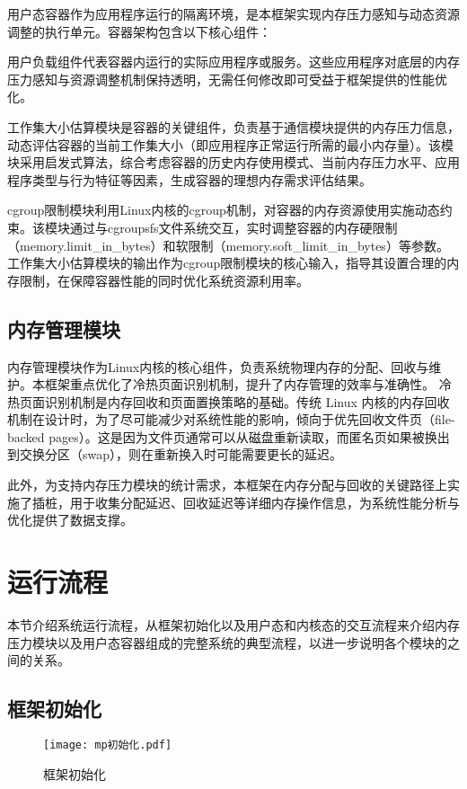 用户态容器作为应用程序运行的隔离环境，是本框架实现内存压力感知与动态资源调整的执行单元。容器架构包含以下核心组件：

用户负载组件代表容器内运行的实际应用程序或服务。这些应用程序对底层的内存压力感知与资源调整机制保持透明，无需任何修改即可受益于框架提供的性能优化。

工作集大小估算模块是容器的关键组件，负责基于通信模块提供的内存压力信息，动态评估容器的当前工作集大小（即应用程序正常运行所需的最小内存量）。该模块采用启发式算法，综合考虑容器的历史内存使用模式、当前内存压力水平、应用程序类型与行为特征等因素，生成容器的理想内存需求评估结果。

cgroup限制模块利用Linux内核的cgroup机制，对容器的内存资源使用实施动态约束。该模块通过与cgroupsfs文件系统交互，实时调整容器的内存硬限制（memory.limit\_in\_bytes）和软限制（memory.soft\_limit\_in\_bytes）等参数。工作集大小估算模块的输出作为cgroup限制模块的核心输入，指导其设置合理的内存限制，在保障容器性能的同时优化系统资源利用率。

\subsection{内存管理模块}

内存管理模块作为Linux内核的核心组件，负责系统物理内存的分配、回收与维护。本框架重点优化了冷热页面识别机制，提升了内存管理的效率与准确性。
冷热页面识别机制是内存回收和页面置换策略的基础。传统 Linux 内核的内存回收机制在设计时，为了尽可能减少对系统性能的影响，倾向于优先回收文件页（file-backed pages）。这是因为文件页通常可以从磁盘重新读取，而匿名页如果被换出到交换分区（swap），则在重新换入时可能需要更长的延迟。

此外，为支持内存压力模块的统计需求，本框架在内存分配与回收的关键路径上实施了插桩，用于收集分配延迟、回收延迟等详细内存操作信息，为系统性能分析与优化提供了数据支撑。


\section{运行流程}

本节介绍系统运行流程，从框架初始化以及用户态和内核态的交互流程来介绍内存压力模块以及用户态容器组成的完整系统的典型流程，以进一步说明各个模块的之间的关系。


\subsection{框架初始化}

\begin{figure}[h]
    \centering
    \texttt{[image: mp初始化.pdf]}
    \caption{框架初始化}
    \label{fig:framework_initialization}
\end{figure}

